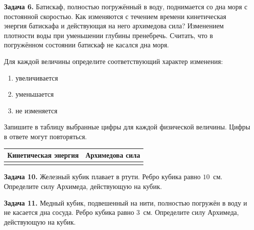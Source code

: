 \begin{taskbasic}[code={\label{task:fluid_v08_n06}}]
\textbf{Задача 6.} Батискаф, полностью погружённый в воду, поднимается со дна моря с постоянной скоростью. Как изменяются с течением времени кинетическая энергия батискафа и действующая на него архимедова сила? Изменением плотности воды при уменьшении глубины пренебречь. Считать, что в погружённом состоянии батискаф не касался дна моря.

Для каждой величины определите соответствующий характер изменения:
\begin{enumerate}
    \item увеличивается
    \item уменьшается
    \item не изменяется
\end{enumerate}

Запишите в таблицу выбранные цифры для каждой физической величины. Цифры в ответе могут повторяться.

\begin{center}
\begin{tabular}{|c|c|}
\hline
Кинетическая энергия & Архимедова сила \\ \hline
& \\ \hline
\end{tabular}
\end{center}

\end{taskbasic}


\begin{taskbasic}[code={\label{task:fluid_iron_cube}}]
\textbf{Задача 10.} Железный кубик плавает в ртути. Ребро кубика равно $10$~см. Определите силу Архимеда, действующую на кубик.

\end{taskbasic}

\begin{taskbasic}[code={\label{task:fluid_copper_cube}}]
\textbf{Задача 11.} Медный кубик, подвешенный на нити, полностью погружён в воду и не касается дна сосуда. Ребро кубика равно $3$~см. Определите силу Архимеда, действующую на кубик.

\end{taskbasic}

